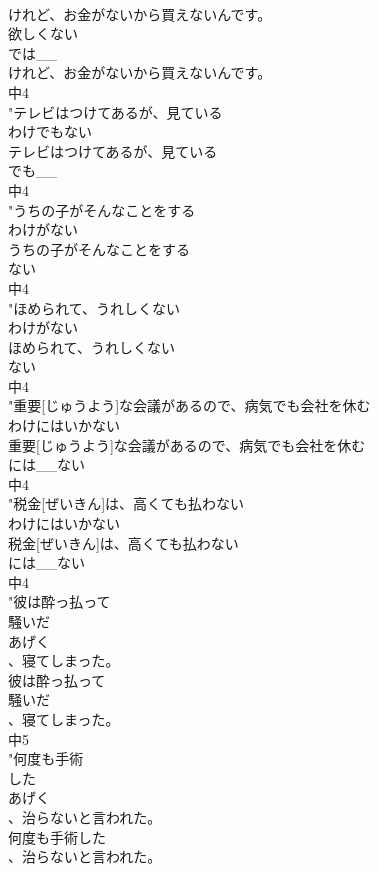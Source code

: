 \documentclass[8pt]{extreport}
\begin{document}
\begin{CJK}{UTF8}{min}
\\	けれど、お金がないから買えないんです。
\\	欲しくない
\\	では__
\\	けれど、お金がないから買えないんです。
\\	中4
\\	"テレビはつけてあるが、見ている
\\	わけでもない
\\	テレビはつけてあるが、見ている
\\	でも__
\\	中4
\\	"うちの子がそんなことをする
\\	わけがない
\\	うちの子がそんなことをする
\\	ない
\\	中4
\\	"ほめられて、うれしくない
\\	わけがない
\\	ほめられて、うれしくない
\\	ない
\\	中4
\\	"重要[じゅうよう]な会議があるので、病気でも会社を休む
\\	わけにはいかない
\\	重要[じゅうよう]な会議があるので、病気でも会社を休む
\\	には__ない
\\	中4
\\	"税金[ぜいきん]は、高くても払わない
\\	わけにはいかない
\\	税金[ぜいきん]は、高くても払わない
\\	には__ない
\\	中4
\\	"彼は酔っ払って
\\	騒いだ
\\	あげく
\\	、寝てしまった。
\\	彼は酔っ払って
\\	騒いだ
\\	、寝てしまった。
\\	中5
\\	"何度も手術
\\	した
\\	あげく
\\	、治らないと言われた。
\\	何度も手術した
\\	、治らないと言われた。

\end{CJK}
\end{document}
